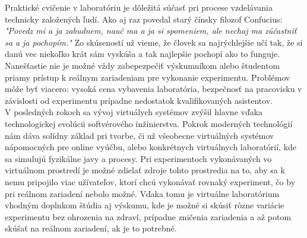 \indent Praktické cvičenie v laboratóriu je dôležitá súčasť pri procese vzdelávania technicky založených ľudí. Ako aj raz povedal starý čínsky filozof Confucius: \textit{"Povedz mi a ja zabudnem, nauč ma a ja si spomeniem, ale nechaj ma zúčastniť sa a ja pochopím."} Zo skúseností už vieme, že človek sa najrýchlejšie učí tak, že si danú vec niekoľko krát sám vyskúša a tak najlepšie pochopí ako to funguje. Nanešťastie nie je možné vždy zabepezpečiť výskumníkom alebo študentom priamy prístup k reálnym zariadeniam pre vykonanie experimentu. Problémov môže byť viacero: vysoká cena vybavenia laboratória, bezpečnosť na pracovisku v závislosti od experimentu prípadne nedostatok kvalifikovaných asistentov.\\
\indent V posledných rokoch sa vývoj virtuálych systémov zvýšil hlavne vďaka technologickej evolúcii softvérového inžinierstva. Pokrok moderných technológií nám dáva solídny základ pri tvorbe, či už všeobecne virtuálných systémov nápomocných pre online vyúčbu, alebo konkrétnych virtuálnych laboratórií, kde sa simulujú fyzikálne javy a procesy. Pri experimentoch vykonávaných vo virtuálnom prostredí je možné zdielať zdroje tohto prostredia na to, aby sa k nemu pripojilo viac užívateľov, ktorí chcú vykonávať rovnaký experiment, čo by pri reálnom zariadení nebolo možné. Vďaka tomu je virtuálne laboratórium vhodným doplnkom štúdia aj výskumu, kde je možné si skúsiť rôzne variácie experimentu bez ohrozenia na zdraví, prípadne zničenia zariadenia a až potom skúšať na reálnom zariadení, ak je to potrebné.\\